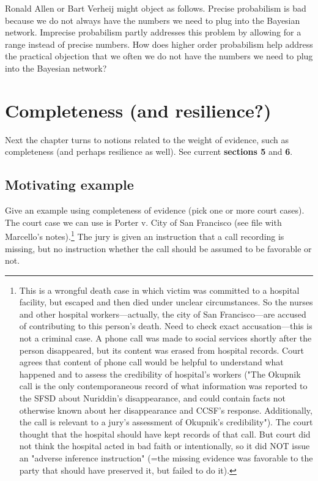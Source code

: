 \documentclass[
  10pt,
  dvipsnames,enabledeprecatedfontcommands]{scrartcl}
\begin{document}
Ronald Allen or Bart Verheij might object as follows. Precise
probabilism is bad because we do not always have the numbers we need to
plug into the Bayesian network. Imprecise probabilism partly addresses
this problem by allowing for a range instead of precise numbers. How
does higher order probabilism help address the practical objection that
we often we do not have the numbers we need to plug into the Bayesian
network?

\hypertarget{completeness-and-resilience}{%
\section{Completeness (and
resilience?)}\label{completeness-and-resilience}}

Next the chapter turns to notions related to the weight of evidence,
such as completeness (and perhaps resilience as well). See current
\textbf{sections 5} and \textbf{6}.

\hypertarget{motivating-example}{%
\subsection{Motivating example}\label{motivating-example}}

Give an example using completeness of evidence (pick one or more court
cases). The court case we can use is Porter v. City of San Francisco
(see file with Marcello's
notes).\footnote{This is a wrongful death case in which victim was committed to a hospital facility, but escaped and then died under unclear circumstances. So the nurses and other hospital workers---actually, the city of San Francisco---are accused of contributing to this person's death. Need to check exact accusation---this is not a criminal case. A phone call was made to social services shortly after the person disappeared, but its content was erased from hospital records. Court agrees that content of phone call would be helpful to understand what happened and to assess the credibility of hospital's workers ("The Okupnik call is the only contemporaneous record of what information was reported to the SFSD about Nuriddin’s disappearance, and could contain facts not otherwise known about her disappearance and CCSF’s response. Additionally, the call is relevant to a jury’s assessment of Okupnik’s credibility"). The court thought that the hospital should have kept records of that call. But court did not think the hospital acted in bad faith or intentionally, so it did NOT issue an "adverse inference instruction" (=the missing evidence was favorable to the party that should have preserved it, but failed to do it).}
The jury is given an instruction that a call recording is missing, but
no instruction whether the call should be assumed to be favorable or
not.
\end{document}
